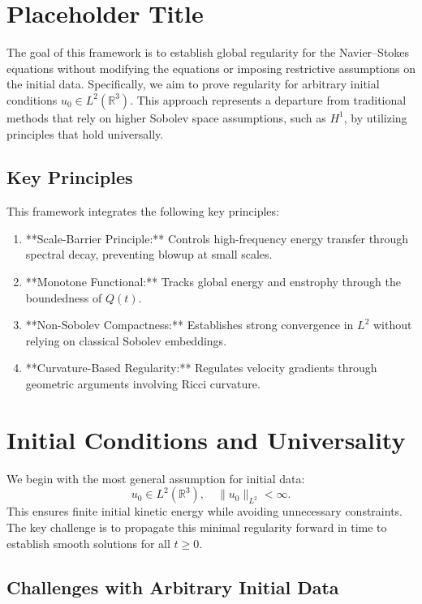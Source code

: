 \section{Placeholder Title}
The goal of this framework is to establish global regularity for the Navier--Stokes equations without modifying the equations or imposing restrictive assumptions on the initial data. Specifically, we aim to prove regularity for arbitrary initial conditions $u_0 \in L^2(\mathbb{R}^3)$. This approach represents a departure from traditional methods that rely on higher Sobolev space assumptions, such as $H^1$, by utilizing principles that hold universally.

\subsection{Key Principles}
This framework integrates the following key principles:
\begin{enumerate}
    \item **Scale-Barrier Principle:** Controls high-frequency energy transfer through spectral decay, preventing blowup at small scales.
    \item **Monotone Functional:** Tracks global energy and enstrophy through the boundedness of $Q(t)$.
    \item **Non-Sobolev Compactness:** Establishes strong convergence in $L^2$ without relying on classical Sobolev embeddings.
    \item **Curvature-Based Regularity:** Regulates velocity gradients through geometric arguments involving Ricci curvature.
\end{enumerate}

\section{Initial Conditions and Universality}

We begin with the most general assumption for initial data:
\begin{equation}
    u_0 \in L^2(\mathbb{R}^3), \quad \|u_0\|_{L^2} < \infty.
\end{equation}
This ensures finite initial kinetic energy while avoiding unnecessary constraints. The key challenge is to propagate this minimal regularity forward in time to establish smooth solutions for all $t \geq 0$.

\subsection{Challenges with Arbitrary Initial Data}

